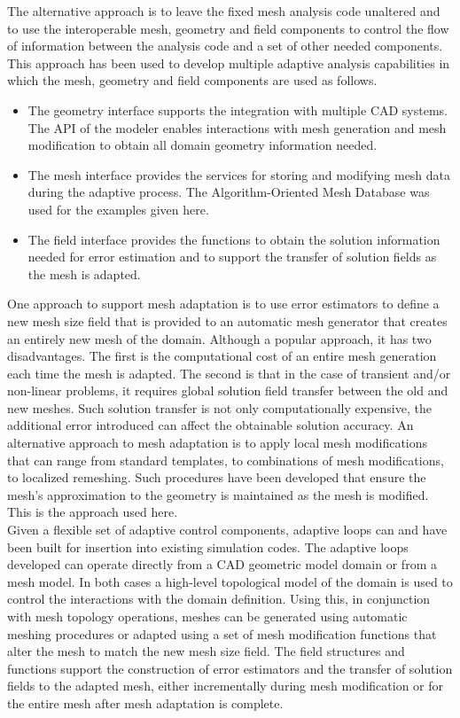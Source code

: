 \documentclass{article}
\begin{document}
The alternative approach is to leave the fixed mesh analysis 
code unaltered and to use the interoperable mesh, geometry and 
field components to control the flow of information between the 
analysis code and a set of other needed components. This approach 
has been used to develop multiple adaptive analysis capabilities 
in which the mesh, geometry and field components are used as 
follows.

\begin{itemize}
\item
The geometry interface supports the integration with multiple 
CAD systems. The API of the modeler enables interactions with 
mesh generation and mesh modification to obtain all domain geometry 
information needed.

\item
The mesh interface provides the services for storing and modifying 
mesh data during the adaptive process. The Algorithm-Oriented 
Mesh Database was used for the examples given here.

\item
The field interface provides the functions to obtain the solution 
information needed for error estimation and to support the transfer 
of solution fields as the mesh is adapted.
\end{itemize}


One approach to support mesh adaptation is to use error estimators 
to define a new mesh size field that is provided to an automatic 
mesh generator that creates an entirely new mesh of the domain. 
Although a popular approach, it has two disadvantages. The first 
is the computational cost of an entire mesh generation each time 
the mesh is adapted. The second is that in the case of transient 
and/or non-linear problems, it requires global solution field 
transfer between the old and new meshes. Such solution transfer 
is not only computationally expensive, the additional error introduced can affect 
the obtainable solution accuracy. An alternative approach to 
mesh adaptation is to apply local mesh modifications that can 
range from standard templates, to combinations of mesh modifications, 
to localized remeshing. Such procedures have been developed that 
ensure the mesh's approximation to the geometry is maintained 
as the mesh is modified. This is the approach used here.\\


Given a flexible set of adaptive control components, adaptive 
loops can and have been built for insertion into existing simulation codes. 
The adaptive loops developed can operate directly from a CAD 
geometric model domain or from a mesh model. In both cases a 
high-level topological model of the domain is used to control 
the interactions with the domain definition. Using this, in conjunction 
with mesh topology operations, meshes can be generated using 
automatic meshing procedures or adapted using a set of mesh modification 
functions that alter the mesh to match the new mesh size field. 
The field structures and functions support the construction of 
error estimators and the transfer of solution fields to the adapted 
mesh, either incrementally during mesh modification or for the 
entire mesh after mesh adaptation is complete.\\
\end{document}
